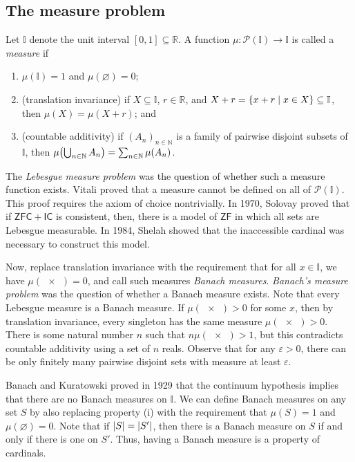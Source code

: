 \subsection{The measure problem}
Let \( \mathbb I \) denote the unit interval \( [0,1] \subseteq \mathbb R \).
A function \( \mu : \mathcal P(\mathbb I) \to \mathbb I \) is called a \emph{measure} if
\begin{enumerate}
    \item \( \mu(\mathbb I) = 1 \) and \( \mu(\varnothing) = 0 \);
    \item (translation invariance) if \( X \subseteq \mathbb I \), \( r \in \mathbb R \), and \( X + r = \qty{x + r \mid x \in X} \subseteq \mathbb I \), then \( \mu(X) = \mu(X + r) \); and
    \item (countable additivity) if \( (A_n)_{n \in \mathbb N} \) is a family of pairwise disjoint subsets of \( \mathbb I \), then \( \mu\qty(\bigcup_{n \in \mathbb N} A_n) = \sum_{n \in \mathbb N}\mu(A_n) \).
\end{enumerate}
The \emph{Lebesgue measure problem} was the question of whether such a measure function exists.
Vitali proved that a measure cannot be defined on all of \( \mathcal P(\mathbb I) \).
This proof requires the axiom of choice nontrivially.
In 1970, Solovay proved that if \( \mathsf{ZFC} + \mathsf{IC} \) is consistent, then, there is a model of \( \mathsf{ZF} \) in which all sets are Lebesgue measurable.
In 1984, Shelah showed that the inaccessible cardinal was necessary to construct this model.

Now, replace translation invariance with the requirement that for all \( x \in \mathbb I \), we have \( \mu(\qty{x}) = 0 \), and call such measures \emph{Banach measures}.
\emph{Banach's measure problem} was the question of whether a Banach measure exists.
Note that every Lebesgue measure is a Banach measure.
If \( \mu(\qty{x}) > 0 \) for some \( x \), then by translation invariance, every singleton has the same measure \( \mu(\qty{x}) > 0 \).
There is some natural number \( n \) such that \( n \mu(\qty{x}) > 1 \), but this contradicts countable additivity using a set of \( n \) reals.
Observe that for any \( \varepsilon > 0 \), there can be only finitely many pairwise disjoint sets with measure at least \( \varepsilon \).

Banach and Kuratowski proved in 1929 that the continuum hypothesis implies that there are no Banach measures on \( \mathbb I \).
We can define Banach measures on any set \( S \) by also replacing property (i) with the requirement that \( \mu(S) = 1 \) and \( \mu(\varnothing) = 0 \).
Note that if \( \abs{S} = \abs{S'} \), then there is a Banach measure on \( S \) if and only if there is one on \( S' \).
Thus, having a Banach measure is a property of cardinals.

